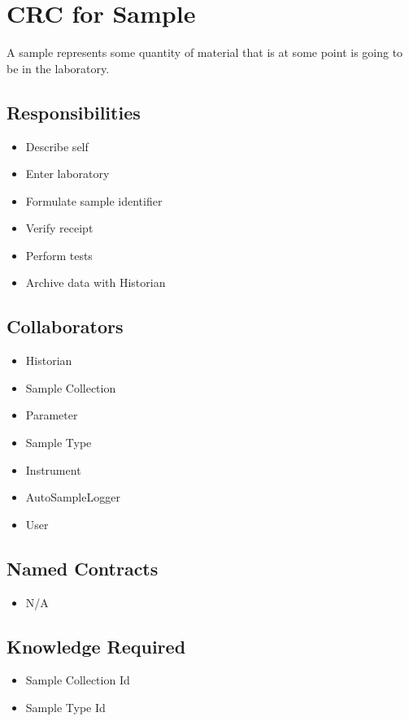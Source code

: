 \documentclass[11pt,twocolumn]{article}
\begin{document}
\section*{CRC for Sample}
 A sample represents some quantity of material that is at some point is going to be in the laboratory. 
\subsection*{Responsibilities}
\begin{itemize}
\item Describe self
\item Enter laboratory
\item Formulate sample identifier
\item Verify receipt
\item Perform tests
\item Archive data with Historian
\end{itemize}

\subsection*{Collaborators}
\begin{itemize}
\item Historian
\item Sample Collection
\item Parameter
\item Sample Type
\item Instrument
\item AutoSampleLogger
\item User
\end{itemize}

\subsection*{Named Contracts}
\begin{itemize}
\item N/A
\end{itemize}

\subsection*{Knowledge Required}
\begin{itemize}
\item Sample Collection Id
\item Sample Type Id
\end{itemize}
\end{document}
